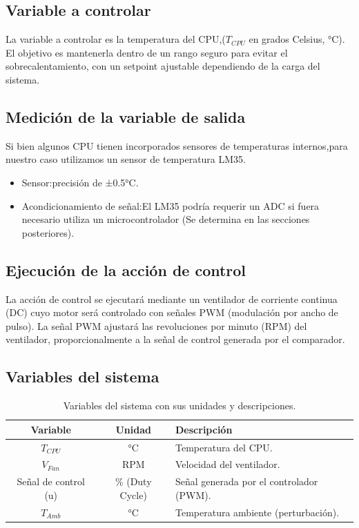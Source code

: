 \documentclass[12pt]{article}
\begin{document}
	\subsection{Variable a controlar}
	La variable a controlar es la temperatura del CPU,($T_{CPU}$ en grados Celsius, °C). El objetivo es mantenerla dentro de un rango seguro para evitar el sobrecalentamiento, con un setpoint ajustable dependiendo de la carga del sistema.
	
	\subsection{Medición de la variable de salida}
	Si bien algunos CPU tienen incorporados sensores de temperaturas internos,para nuestro caso utilizamos un sensor de temperatura LM35.
	
	\begin{itemize}
		\item Sensor:precisión de ±0.5°C.
		\item Acondicionamiento de señal:El LM35 podría requerir un ADC si fuera necesario utiliza un microcontrolador (Se determina en las secciones posteriores).
	\end{itemize}
	
	
	
	\subsection{Ejecución de la acción de control}
	La acción de control se ejecutará mediante un ventilador de corriente continua (DC) cuyo motor será controlado con señales PWM (modulación por ancho de pulso). La señal PWM ajustará las revoluciones por minuto (RPM) del ventilador, proporcionalmente a la señal de control generada por el comparador.
	
	
	\subsection{Variables del sistema}
	\begin{table}[h!]
		\centering
		\begin{tabular}{|c|c|l|}
			\hline
			\textbf{Variable} & \textbf{Unidad} & \textbf{Descripción} \\ \hline
			$T_{CPU}$ & °C & Temperatura del CPU. \\ \hline
			$V_{Fan}$ & RPM & Velocidad del ventilador. \\ \hline
			Señal de control (u) & \% (Duty Cycle) & Señal generada por el controlador (PWM). \\ \hline
			$T_{Amb}$ & °C & Temperatura ambiente (perturbación). \\ \hline
		\end{tabular}
		\caption{Variables del sistema con sus unidades y descripciones.}
		\label{tab:variables}
	\end{table}
	
\end{document}
